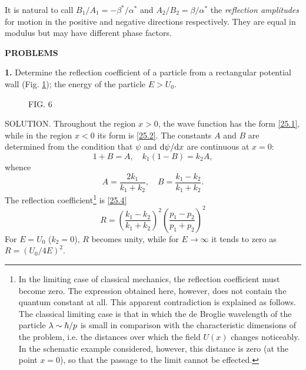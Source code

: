 It is natural to call $ B_1/A_1 = -\beta^*/\alpha^* $ and $ A_2/B_2 = \beta/\alpha^* $ the \textit{reflection amplitudes} for motion in the positive and negative directions respectively. They are equal in modulus but may have different phase factors.





{\small
\textbf{PROBLEMS}


\textbf{1.} Determine the reflection coefficient of a particle from a rectangular potential wall (Fig. \ref{Fig.6}); the energy of the particle $ E > U_0 $.


\begin{wrapfigure}[]{l}[0cm]{0cm}
	\caption{FIG. 6}\label{Fig.6}
\end{wrapfigure}






SOLUTION. Throughout the region $ x > 0 $, the wave function has the form \eqref{25.1}, while in the region $ x < 0 $ its form is \eqref{25.2}. The constants $ A $ and $ B $ are determined from the condition that $\psi$ and $\mathrm{d}\psi/\mathrm{d} x $ are continuous at $ x = 0 $:
\[ 1+B=A,\quad k_1(1-B)=k_2 A, \]
whence
\[ A=\frac{2k_1}{k_1+k_2},\quad B=\frac{k_1-k_2}{k_1+k_2}. \]
The reflection coefficient\footnote{In the limiting case of classical mechanics, the reflection coefficient must become zero. The expression obtained here, however, does not contain the quantum constant at all. This apparent contradiction is explained as follows. The classical limiting case is that in which the de Broglie wavelength of the particle $ \lambda\sim\hbar/p $ is small in comparison with the characteristic dimensions of the problem, i.e. the distances over which the field $ U (x) $ changes noticeably. In the schematic example considered, however, this distance is zero (at the point $ x = 0 $), so that the passage to the limit cannot be effected.} is \eqref{25.4}
\[ R=\left(\frac{k_1-k_2}{k_1+k_2} \right)^2\left(\frac{p_1-p_2}{p_1+p_2} \right)^2 \]
For $ E = U_0 $ ($ k_2 = 0 $), $ R $ becomes unity, while for $ E \to\infty $ it tends to zero as $ R=(U_0/4E)^2 $.





}
